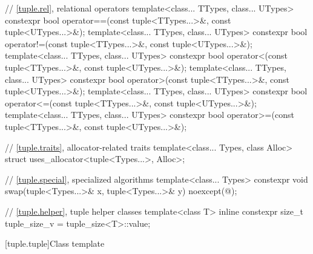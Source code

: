 \begin{codeblock}
{  // \ref{tuple.rel}, relational operators
  template<class... TTypes, class... UTypes>
    constexpr bool operator==(const tuple<TTypes...>&, const tuple<UTypes...>&);
  template<class... TTypes, class... UTypes>
    constexpr bool operator!=(const tuple<TTypes...>&, const tuple<UTypes...>&);
  template<class... TTypes, class... UTypes>
    constexpr bool operator<(const tuple<TTypes...>&, const tuple<UTypes...>&);
  template<class... TTypes, class... UTypes>
    constexpr bool operator>(const tuple<TTypes...>&, const tuple<UTypes...>&);
  template<class... TTypes, class... UTypes>
    constexpr bool operator<=(const tuple<TTypes...>&, const tuple<UTypes...>&);
  template<class... TTypes, class... UTypes>
    constexpr bool operator>=(const tuple<TTypes...>&, const tuple<UTypes...>&);

  // \ref{tuple.traits}, allocator-related traits
  template<class... Types, class Alloc>
    struct uses_allocator<tuple<Types...>, Alloc>;

  // \ref{tuple.special}, specialized algorithms
  template<class... Types>
    constexpr void swap(tuple<Types...>& x, tuple<Types...>& y) noexcept(@\seebelow@);

  // \ref{tuple.helper}, tuple helper classes
  template<class T>
    inline constexpr size_t tuple_size_v = tuple_size<T>::value;
}
\end{codeblock}

[tuple.tuple]{Class template }
%

